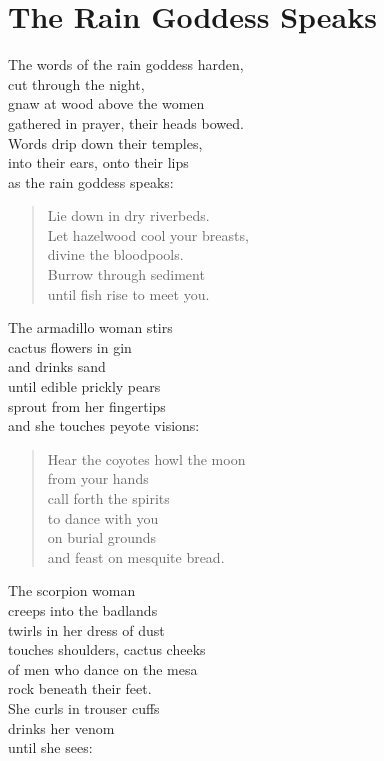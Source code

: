\documentclass[twoside,10pt]{book}
\begin{document}
\clearpage
\section{The Rain Goddess Speaks}

The words of the rain goddess harden,\\
cut through the night,\\
gnaw at wood above the women\\
gathered in prayer, their heads bowed.\\
Words drip down their temples,\\
into their ears, onto their lips\\
as the rain goddess speaks:

\begin{quote}
Lie down in dry riverbeds.\\
Let hazelwood cool your breasts,\\
divine the bloodpools.\\
Burrow through sediment\\
until fish rise to meet you.
\end{quote}

The armadillo woman stirs\\
cactus flowers in gin\\
and drinks sand\\
until edible prickly pears\\
sprout from her fingertips\\
and she touches peyote visions:

\begin{quote}
Hear the coyotes howl the moon\\
from your hands\\
call forth the spirits\\
to dance with you\\
on burial grounds\\
and feast on mesquite bread.
\end{quote}

The scorpion woman\\
creeps into the badlands\\
twirls in her dress of dust\\
touches shoulders, cactus cheeks\\
of men who dance on the mesa\\
rock beneath their feet.\\
She curls in trouser cuffs\\
drinks her venom\\
until she sees:
\end{document}
